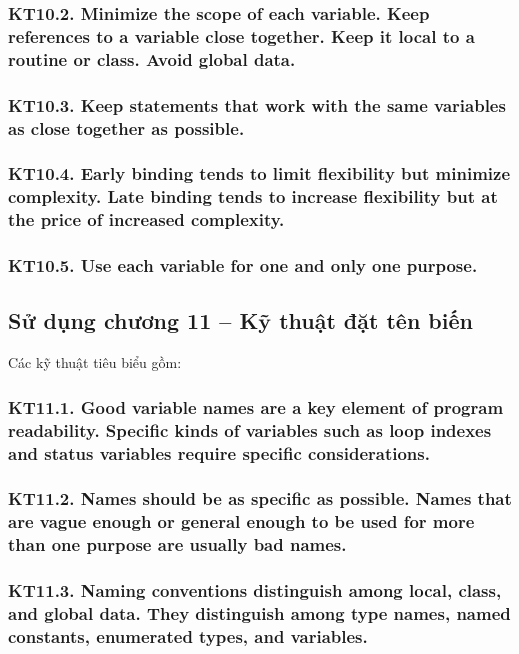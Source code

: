 \documentclass[12pt]{report}
\begin{document}
\subsubsection{KT10.2. Minimize the scope of each variable. Keep references to a variable close together. Keep it local to a routine or class. Avoid global data.}
\subsubsection{KT10.3. Keep statements that work with the same variables as close together as possible.}
\subsubsection{KT10.4. Early binding tends to limit flexibility but minimize complexity. Late binding tends to increase flexibility but at the price of increased complexity.}
\subsubsection{KT10.5. Use each variable for one and only one purpose.}


\subsection{Sử dụng chương 11 -- Kỹ thuật đặt tên biến}
\noindent Các kỹ thuật tiêu biểu gồm:

\subsubsection{KT11.1. Good variable names are a key element of program readability. Specific kinds of variables such as loop indexes and status variables require specific considerations.}

\subsubsection{KT11.2. Names should be as specific as possible. Names that are vague enough or general enough to be used for more than one purpose are usually bad names.}

\subsubsection{KT11.3. Naming conventions distinguish among local, class, and global data. They distinguish among type names, named constants, enumerated types, and variables.}
\end{document}
